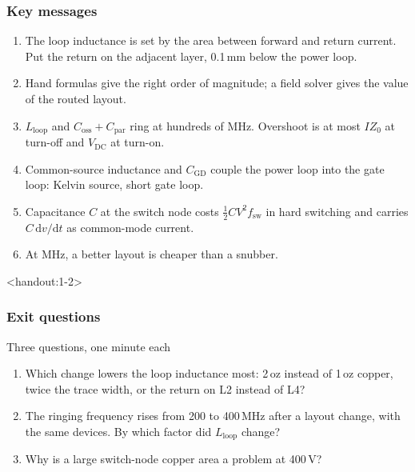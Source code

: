 \begin{frame}
	\frametitle{Key messages}
	\begin{enumerate}
		\item The loop inductance is set by the area between forward and return current. Put the return on the adjacent layer, 0.1\,mm below the power loop.
		\item Hand formulas give the right order of magnitude; a field solver gives the value of the routed layout.
		\item $L_\mathrm{loop}$ and $C_\mathrm{oss}+C_\mathrm{par}$ ring at hundreds of MHz. Overshoot is at most $IZ_0$ at turn-off and $V_\mathrm{DC}$ at turn-on.
		\item Common-source inductance and $C_\mathrm{GD}$ couple the power loop into the gate loop: Kelvin source, short gate loop.
		\item Capacitance $C$ at the switch node costs $\frac12CV^2f_\mathrm{sw}$ in hard switching and carries $C\,\mathrm{d}v/\mathrm{d}t$ as common-mode current.
		\item At MHz, a better layout is cheaper than a snubber.
	\end{enumerate}
\end{frame}

\begin{frame}<handout:1-2>
	\frametitle{Exit questions}
	\begin{varblock}[\textwidth]{Three questions, one minute each}
		\begin{enumerate}
			\item Which change lowers the loop inductance most: 2\,oz instead of 1\,oz copper, twice the trace width, or the return on L2 instead of L4?
			\item The ringing frequency rises from 200 to 400\,MHz after a layout change, with the same devices. By which factor did $L_\mathrm{loop}$ change?
			\item Why is a large switch-node copper area a problem at 400\,V?
		\end{enumerate}
	\end{varblock}
\end{frame}

